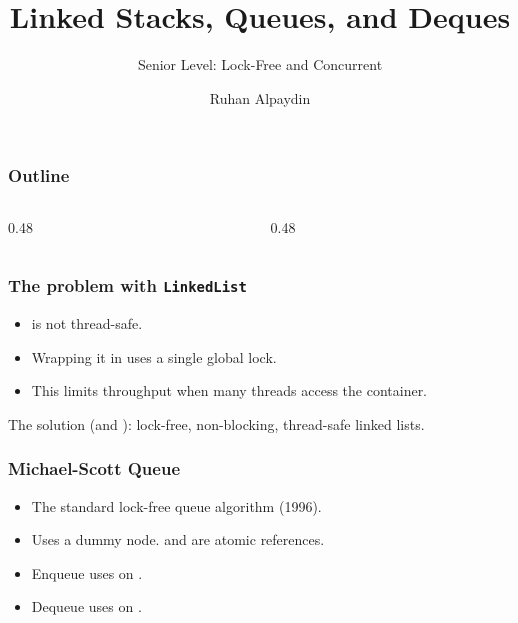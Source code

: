 \documentclass[aspectratio=169,10pt,compress]{beamer}
\title{Linked Stacks, Queues, and Deques}
\subtitle{Senior Level: Lock-Free and Concurrent}
\author[Bingol]{Ruhan Alpaydin}
\institute[FCIS]{Faculty of Computer and Information Sciences\\Yeditepe University}
\date{{\tiny \hbTimeStamp}}
\begin{document}
\begin{frame}[t,fragile]\titlepage\end{frame}

\begin{frame}[t,fragile]\frametitle{Outline}
  \begin{columns}[T]
    \begin{column}{0.48\textwidth}\tableofcontents[sections={1-3},hideallsubsections]\end{column}
    \begin{column}{0.48\textwidth}\tableofcontents[sections={4-5},hideallsubsections]\end{column}
  \end{columns}
\end{frame}

\begin{frame}[t,fragile]\frametitle{The problem with \texttt{LinkedList}}
  \begin{itemize}\small
    \item {} is not thread-safe.
    \item Wrapping it in  uses a single global lock.
    \item This limits throughput when many threads access the container.
  \end{itemize}
  \begin{block}{The solution}
    \small
     (and ): 
    lock-free, non-blocking, thread-safe linked lists.
  \end{block}
\end{frame}

\begin{frame}[t,fragile]\frametitle{Michael-Scott Queue}
  \begin{itemize}\small
    \item The standard lock-free queue algorithm (1996).
    \item Uses a dummy node.  and  are atomic references.
    \item Enqueue uses  on .
    \item Dequeue uses  on .
  \end{itemize}
  \vspace{0.3em}
  \small
\end{frame}
\end{document}
